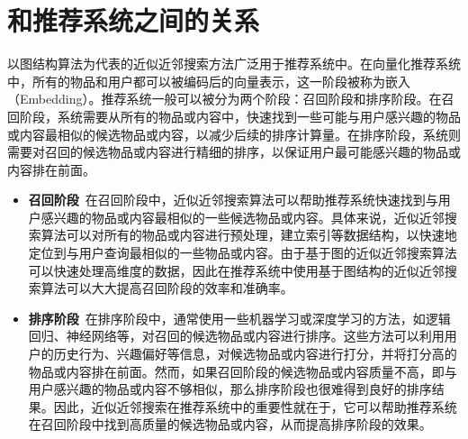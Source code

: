 \section{和推荐系统之间的关系}\label{sec:bg-rm}

以图结构算法为代表的近似近邻搜索方法广泛用于推荐系统中。在向量化推荐系统中，所有的物品和用户都可以被编码后的向量表示，这一阶段被称为嵌入（Embedding）\cite{yi2019deep, zhang2016collaborative, khoshneshin2010collaborative, chen2019collaborative, rahutomo2019embedding}。推荐系统一般可以被分为两个阶段：召回阶段和排序阶段。在召回阶段，系统需要从所有的物品或内容中，快速找到一些可能与用户感兴趣的物品或内容最相似的候选物品或内容，以减少后续的排序计算量。在排序阶段，系统则需要对召回的候选物品或内容进行精细的排序，以保证用户最可能感兴趣的物品或内容排在前面。
\begin{itemize}
  \item \textbf{召回阶段}~在召回阶段中，近似近邻搜索算法可以帮助推荐系统快速找到与用户感兴趣的物品或内容最相似的一些候选物品或内容。具体来说，近似近邻搜索算法可以对所有的物品或内容进行预处理，建立索引等数据结构，以快速地定位到与用户查询最相似的一些物品或内容。由于基于图的近似近邻搜索算法可以快速处理高维度的数据，因此在推荐系统中使用基于图结构的近似近邻搜索算法可以大大提高召回阶段的效率和准确率。
  \item \textbf{排序阶段}~在排序阶段中，通常使用一些机器学习或深度学习的方法，如逻辑回归\cite{wang2016mobile, oladipo2021improved, tian2019music}、神经网络\cite{liu2016recurrent, rivas2020social, covington2016deep}等，对召回的候选物品或内容进行排序。这些方法可以利用用户的历史行为、兴趣偏好等信息，对候选物品或内容进行打分，并将打分高的物品或内容排在前面。然而，如果召回阶段的候选物品或内容质量不高，即与用户感兴趣的物品或内容不够相似，那么排序阶段也很难得到良好的排序结果。因此，近似近邻搜索在推荐系统中的重要性就在于，它可以帮助推荐系统在召回阶段中找到高质量的候选物品或内容，从而提高排序阶段的效果。
\end{itemize}






